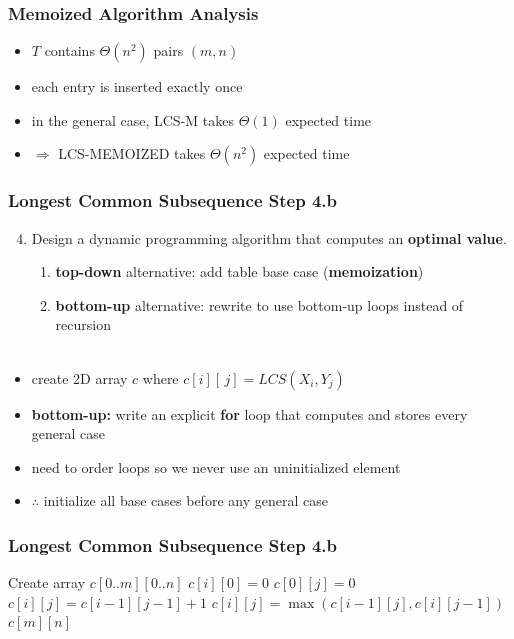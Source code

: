 \documentclass[10pt,aspectratio=169]{beamer}
\newcommand{\stanza}{ \\~\ }
\begin{document}
\begin{frame} \frametitle{Memoized Algorithm Analysis}
  \begin{itemize}
    \item $T$ contains $\Theta(n^2)$ pairs $(m, n)$
    \item each entry is inserted exactly once
    \item in the general case, LCS-M takes $\Theta(1)$ expected time
    \item $\Rightarrow$ LCS-MEMOIZED takes $\Theta(n^2)$ expected time
  \end{itemize}
\end{frame}

\begin{frame} \frametitle{Longest Common Subsequence Step 4.b}
  \begin{enumerate}
    \setcounter{enumi}{3}
    \item Design a dynamic programming algorithm that computes an \textbf{optimal value}.
    \begin{enumerate}
      \item \textbf{top-down} alternative: add table base case (\textbf{memoization})
      \item \textbf{bottom-up} alternative: rewrite to use bottom-up loops instead of recursion
      \stanza
    \end{enumerate}
\end{enumerate}

\begin{itemize}
  \item create 2D array $c$ where $c[i][\, j] = LCS(X_i, Y_j)$
  \item \textbf{bottom-up:} write an explicit \textbf{for} loop that computes and stores every general case
  \item need to order loops so we never use an uninitialized element
  \item $\therefore$ initialize all base cases before any general case
\end{itemize}
\end{frame}
  
\begin{frame} \frametitle{Longest Common Subsequence Step 4.b}
  {\footnotesize
  \begin{algorithmic}[1]
    \State Create array $c[0..m][0..n]$ 
      \State $c[i][0] = 0$
    \EndFor
     
      \State $c[0][j] = 0$
    \EndFor
          \State $c[i][j] = c[i-1][j-1] + 1$
        \Else
          \State $c[i][j] = \max(c[i-1][j], c[i][j-1])$
        \EndIf
      \EndFor
    \EndFor
    \State \Return $c[m][n]$
    \EndFunction
  \end{algorithmic}
  }
\end{frame}
\end{document}
